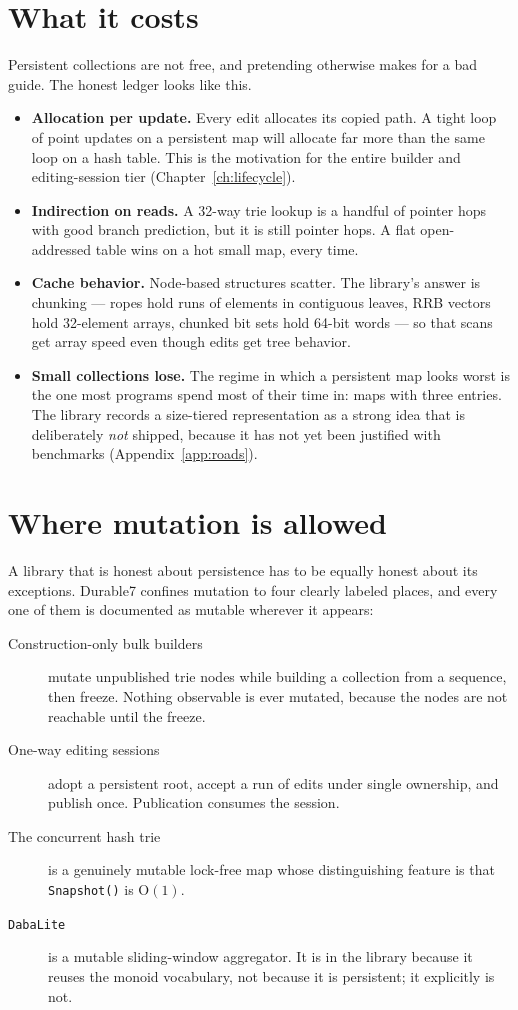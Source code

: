 \documentclass[11pt,twoside,openright]{book}
\newcommand{\code}[1]{\texorpdfstring{\textcolor{d7ink}{\texttt{#1}}}{#1}}
\newcommand{\bigoh}[1]{$\mathrm{O}(#1)$}
\begin{document}
\section{What it costs}

Persistent collections are not free, and pretending otherwise makes for a bad
guide. The honest ledger looks like this.

\begin{itemize}
\item \textbf{Allocation per update.} Every edit allocates its copied path. A
tight loop of point updates on a persistent map will allocate far more than the
same loop on a hash table. This is the motivation for the entire builder and
editing-session tier (Chapter~\ref{ch:lifecycle}).
\item \textbf{Indirection on reads.} A 32-way trie lookup is a handful of
pointer hops with good branch prediction, but it is still pointer hops. A flat
open-addressed table wins on a hot small map, every time.
\item \textbf{Cache behavior.} Node-based structures scatter. The library's
answer is chunking --- ropes hold runs of elements in contiguous leaves, RRB
vectors hold 32-element arrays, chunked bit sets hold 64-bit words --- so that
scans get array speed even though edits get tree behavior.
\item \textbf{Small collections lose.} The regime in which a persistent map
looks worst is the one most programs spend most of their time in: maps with
three entries. The library records a size-tiered representation as a strong idea
that is deliberately \emph{not} shipped, because it has not yet been justified
with benchmarks (Appendix~\ref{app:roads}).
\end{itemize}

\section{Where mutation is allowed}

A library that is honest about persistence has to be equally honest about its
exceptions. Durable7 confines mutation to four clearly labeled places, and
every one of them is documented as mutable wherever it appears:

\begin{description}
\item[Construction-only bulk builders] mutate unpublished trie nodes while
building a collection from a sequence, then freeze. Nothing observable is ever
mutated, because the nodes are not reachable until the freeze.
\item[One-way editing sessions] adopt a persistent root, accept a run of edits
under single ownership, and publish once. Publication consumes the session.
\item[The concurrent hash trie] is a genuinely mutable lock-free map whose
distinguishing feature is that \code{Snapshot()} is \bigoh{1}.
\item[\code{DabaLite}] is a mutable sliding-window aggregator. It is in the
library because it reuses the monoid vocabulary, not because it is persistent;
it explicitly is not.
\end{description}
\end{document}
